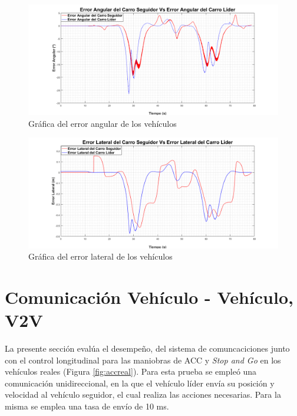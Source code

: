 \begin{figure}[H]
	\centering
		\includegraphics[scale=0.35]{Imagenes/eaacl}
		\caption{Gráfica del error angular de los vehículos}
		\label{fig:eaacl}
\end{figure}	

\begin{figure}[H]
	\centering
		\includegraphics[scale=0.35]{Imagenes/elacl}
		\caption{Gráfica del error lateral de los vehículos}
		\label{fig:elacl}
\end{figure}	

\section{Comunicación Vehículo - Vehículo, V2V}
La presente sección evalúa el desempeño, del sistema de comuncaciciones junto con el control longitudinal para las maniobras de ACC y \textit{Stop and Go} en los vehículos reales (Figura \ref{fig:accreal}). Para esta prueba se empleó una comunicación unidireccional, en la que el vehículo líder envía su posición y velocidad al vehículo seguidor, el cual realiza las acciones necesarias. Para la misma se emplea una tasa de envío de 10 ms.\\

